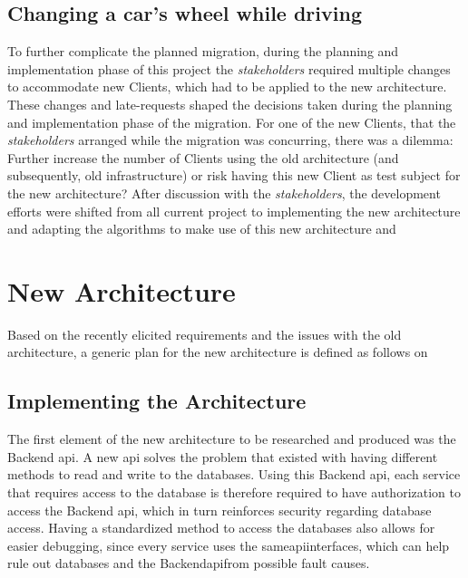 \subsection{Changing a car's wheel while driving}\label{methodology:s:changing-a-cars-wheel-while-driving}
To further complicate the planned migration, during the planning and implementation phase of this project the \textit{stakeholders} required multiple changes to accommodate new Clients, which had to be applied to the new architecture. These changes and late-requests shaped the decisions taken during the planning and implementation phase of the migration. For one of the new Clients, that the \textit{stakeholders} arranged while the migration was concurring, there was a dilemma: Further increase the number of Clients using the old architecture (and subsequently, old infrastructure) or risk having this new Client as test subject for the new architecture? After discussion with the \textit{stakeholders}, the development efforts were shifted from all current project to implementing the new architecture and adapting the algorithms to make use of this new architecture and 


\section{New Architecture}\label{methodology:s:new_architecture}



Based on the recently elicited requirements and the issues with the old architecture, a generic plan for the new architecture is defined as follows on 









\subsection{Implementing the Architecture}\label{methodology:ss:implementing-the-architecture}

The first element of the new architecture to be researched and produced was the Backend \gls{api}. A new \gls{api} solves the problem that existed with having different methods to read and write to the databases. Using this Backend \gls{api}, each service that requires access to the database is therefore required to have authorization to access the Backend \gls{api}, which in turn reinforces security regarding database access. Having a standardized method to access the databases also allows for easier debugging, since every service uses the same\gls{api}interfaces, which can help rule out databases and the Backend\gls{api}from possible fault causes.

